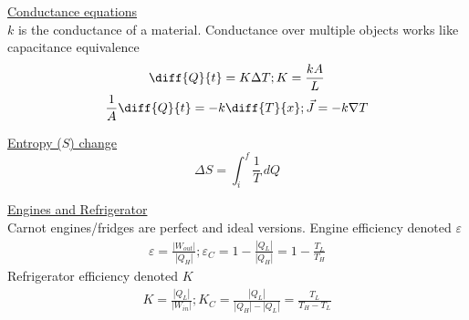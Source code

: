 \documentclass[8pt]{minimal}
\begin{document}
    \underline{Conductance equations}\\
    $k$ is the conductance of a material.
    Conductance over multiple objects works like capacitance equivalence
    \begin{gather*}
        \diff{Q}{t} =   K \Delta T; 
        K   =   \frac{kA}{L}\\
        \frac{1}{A}\diff{Q}{t}  =   -k\diff{T}{x};
        \vec{J} =   -k \nabla T
    \end{gather*}

    \underline{Entropy ($S$) change}
    \begin{equation*}
        \Delta S    =   \int_{i}^{f}\frac{1}{T}\,dQ
    \end{equation*}

    \underline{Engines and Refrigerator}\\
    Carnot engines/fridges are perfect and ideal versions.
    Engine efficiency denoted $\varepsilon$
    \begin{gather*}
        \varepsilon =   \frac{|W_{out}|}{|Q_{H}|}; 
        \varepsilon_C   =   1 - \frac{|Q_{L}|}{|Q_{H}|}
            =   1 - \frac{T_L}{T_H}
    \end{gather*}
    Refrigerator efficiency denoted $K$
    \begin{gather*}
        K   =   \frac{|Q_L|}{|W_{in}|}; 
        K_C =   \frac{|Q_{L}|}{|Q_{H}| - |Q_{L}|}
            =   \frac{T_L}{T_H - T_L}
    \end{gather*}
\end{document}
